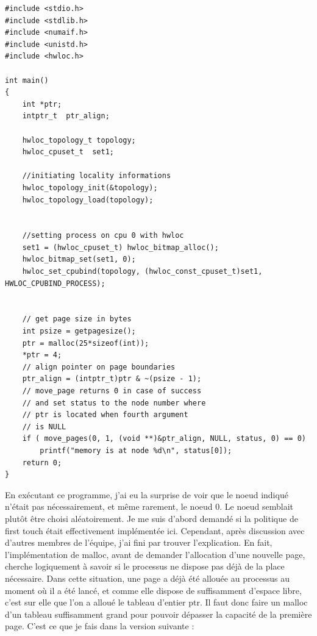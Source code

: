 \documentclass{report}
\begin{document}
\begin{lstlisting}
#include <stdio.h>
#include <stdlib.h>
#include <numaif.h>
#include <unistd.h>
#include <hwloc.h>

int main()
{
	int *ptr;
	intptr_t  ptr_align;

	hwloc_topology_t topology;
	hwloc_cpuset_t  set1;

	//initiating locality informations
	hwloc_topology_init(&topology);
	hwloc_topology_load(topology);
	
	
	//setting process on cpu 0 with hwloc
	set1 = (hwloc_cpuset_t) hwloc_bitmap_alloc();
	hwloc_bitmap_set(set1, 0);
	hwloc_set_cpubind(topology, (hwloc_const_cpuset_t)set1, HWLOC_CPUBIND_PROCESS);


	// get page size in bytes
	int psize = getpagesize();
	ptr = malloc(25*sizeof(int));
	*ptr = 4;
	// align pointer on page boundaries
	ptr_align = (intptr_t)ptr & ~(psize - 1);
	// move_page returns 0 in case of success
	// and set status to the node number where 
	// ptr is located when fourth argument
	// is NULL
	if ( move_pages(0, 1, (void **)&ptr_align, NULL, status, 0) == 0)
		printf("memory is at node %d\n", status[0]);
	return 0;
}

\end{lstlisting}
En exécutant ce programme, j'ai eu la surprise de voir que le noeud indiqué n'était pas
nécessairement, et même rarement, le noeud 0. Le noeud semblait plutôt être
choisi aléatoirement. Je me suis d'abord demandé si la politique de first touch était 
effectivement implémentée ici. Cependant, après discussion avec d'autres membres de l'équipe,
j'ai fini par trouver l'explication. En fait, l'implémentation de malloc, avant de demander
l'allocation d'une nouvelle page, cherche logiquement à savoir si le processus ne dispose
pas déjà de la place nécessaire. Dans cette situation, une page a déjà été allouée au processus
au moment où il a été lancé, et comme elle dispose de suffisamment d'espace libre, c'est sur elle
que l'on a alloué le tableau d'entier ptr. Il faut donc faire un malloc d'un tableau suffisamment
grand pour pouvoir dépasser la capacité de la première page. C'est ce que je fais dans la version
suivante : 
\end{document}
